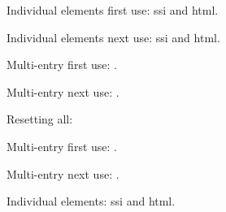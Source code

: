 \documentclass[12pt]{article}
\begin{document}
Individual elements first use: \gls{ssi} and \gls{html}. 

Individual elements next use: \gls{ssi} and \gls{html}. 

Multi-entry first use: . 

Multi-entry next use: . 

Resetting all\glsresetall{}: 

Multi-entry first use: . 

Multi-entry next use: . 

Individual elements: \gls{ssi} and \gls{html}.
\printglossaries 
\end{document}
